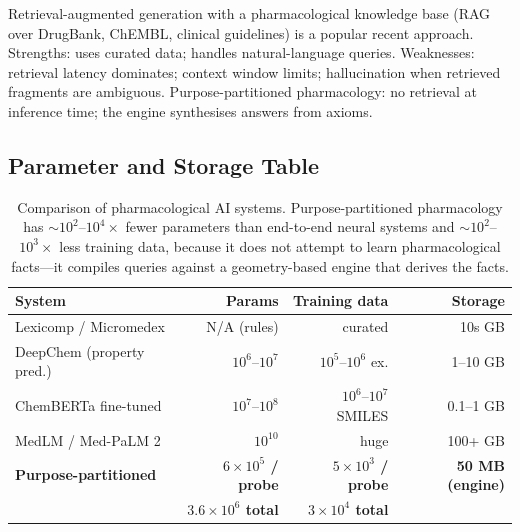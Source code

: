\documentclass[11pt,twocolumn,a4paper]{article}
\theoremstyle{definition}
\theoremstyle{remark}
\begin{document}
Retrieval-augmented generation with a pharmacological knowledge base (RAG over DrugBank, ChEMBL, clinical guidelines) is a popular recent approach. Strengths: uses curated data; handles natural-language queries. Weaknesses: retrieval latency dominates; context window limits; hallucination when retrieved fragments are ambiguous. Purpose-partitioned pharmacology: no retrieval at inference time; the engine synthesises answers from axioms.

\subsection{Parameter and Storage Table}

\begin{table}[H]
\centering
\small
\begin{tabular}{lrrr}
\toprule
\textbf{System} & \textbf{Params} & \textbf{Training data} & \textbf{Storage} \\
\midrule
Lexicomp / Micromedex & N/A (rules) & curated & 10s GB \\
DeepChem (property pred.) & $10^6$--$10^7$ & $10^5$--$10^6$ ex. & 1--10 GB \\
ChemBERTa fine-tuned & $10^7$--$10^8$ & $10^6$--$10^7$ SMILES & 0.1--1 GB \\
MedLM / Med-PaLM 2 & $10^{10}$ & huge & 100+ GB \\
\textbf{Purpose-partitioned} & \textbf{$6 \times 10^5$ / probe} & \textbf{$5 \times 10^3$ / probe} & \textbf{50 MB (engine)} \\
& \textbf{$3.6 \times 10^6$ total} & \textbf{$3 \times 10^4$ total} & \\
\bottomrule
\end{tabular}
\caption{Comparison of pharmacological AI systems. Purpose-partitioned pharmacology has $\sim\!10^2$--$10^4 \times$ fewer parameters than end-to-end neural systems and $\sim\!10^2$--$10^3 \times$ less training data, because it does not attempt to learn pharmacological facts---it compiles queries against a geometry-based engine that derives the facts.}
\label{tab:comparison}
\end{table}
\end{document}
